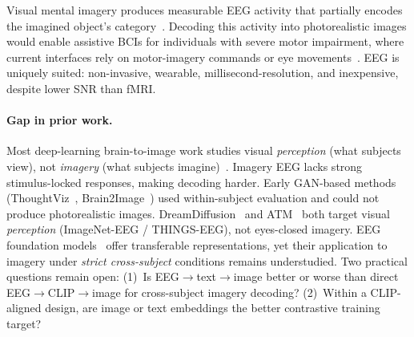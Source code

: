 \documentclass{article}
\begin{document}
Visual mental imagery produces measurable EEG activity that partially encodes the imagined object's category~\citep{kosslyn2001neural}. Decoding this activity into photorealistic images would enable assistive BCIs for individuals with severe motor impairment, where current interfaces rely on motor-imagery commands or eye movements~\citep{birbaumer2000bci}. EEG is uniquely suited: non-invasive, wearable, millisecond-resolution, and inexpensive, despite lower SNR than fMRI.

\paragraph{Gap in prior work.} Most deep-learning brain-to-image work studies visual \emph{perception} (what subjects view), not \emph{imagery} (what subjects imagine)~\citep{ozcelik2023brain,scotti2024mindeye}. Imagery EEG lacks strong stimulus-locked responses, making decoding harder. Early GAN-based methods (ThoughtViz~\citep{tirupattur2018thoughtviz}, Brain2Image~\citep{kavasidis2017brain2image}) used within-subject evaluation and could not produce photorealistic images. DreamDiffusion~\citep{bai2023dreamdiffusion} and ATM~\citep{li2024atm} both target visual \emph{perception} (ImageNet-EEG / THINGS-EEG), not eyes-closed imagery. EEG foundation models~\citep{kostas2022bendr,jiang2024labram,zhu2024csbrain} offer transferable representations, yet their application to imagery under \emph{strict cross-subject} conditions remains understudied. Two practical questions remain open: (1)~Is EEG$\to$text$\to$image better or worse than direct EEG$\to$CLIP$\to$image for cross-subject imagery decoding? (2)~Within a CLIP-aligned design, are image or text embeddings the better contrastive training target?
\end{document}
